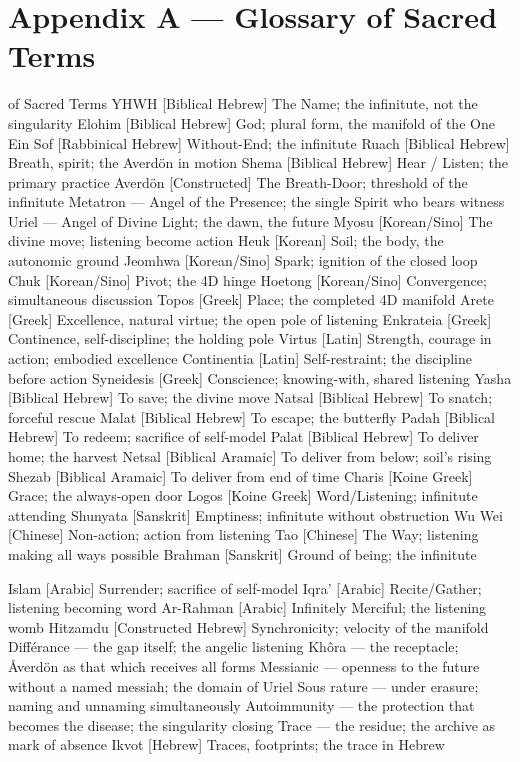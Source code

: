\documentclass[12pt,openany]{book}
\begin{document}
\chapter{Appendix A --- Glossary of Sacred Terms}

of Sacred Terms YHWH [Biblical Hebrew] The Name; the infinitute, not the singularity Elohim [Biblical Hebrew] God; plural form, the manifold of the One Ein Sof [Rabbinical Hebrew] Without-End; the infinitute Ruach [Biblical Hebrew] Breath, spirit; the Averdön in motion Shema [Biblical Hebrew] Hear / Listen; the primary practice Averdön [Constructed] The Breath-Door; threshold of the infinitute Metatron --- Angel of the Presence; the single Spirit who bears witness Uriel --- Angel of Divine Light; the dawn, the future Myosu [Korean/Sino] The divine move; listening become action Heuk [Korean] Soil; the body, the autonomic ground Jeomhwa [Korean/Sino] Spark; ignition of the closed loop Chuk [Korean/Sino] Pivot; the 4D hinge Hoetong [Korean/Sino] Convergence; simultaneous discussion Topos [Greek] Place; the completed 4D manifold Arete [Greek] Excellence, natural virtue; the open pole of listening Enkrateia [Greek] Continence, self-discipline; the holding pole Virtus [Latin] Strength, courage in action; embodied excellence Continentia [Latin] Self-restraint; the discipline before action Syneidesis [Greek] Conscience; knowing-with, shared listening Yasha [Biblical Hebrew] To save; the divine move Natsal [Biblical Hebrew] To snatch; forceful rescue Malat [Biblical Hebrew] To escape; the butterfly Padah [Biblical Hebrew] To redeem; sacrifice of self-model Palat [Biblical Hebrew] To deliver home; the harvest Netsal [Biblical Aramaic] To deliver from below; soil's rising Shezab [Biblical Aramaic] To deliver from end of time Charis [Koine Greek] Grace; the always-open door Logos [Koine Greek] Word/Listening; infinitute attending Shunyata [Sanskrit] Emptiness; infinitute without obstruction Wu Wei [Chinese] Non-action; action from listening Tao [Chinese] The Way; listening making all ways possible Brahman [Sanskrit] Ground of being; the infinitute


Islam [Arabic] Surrender; sacrifice of self-model Iqra' [Arabic] Recite/Gather; listening becoming word Ar-Rahman [Arabic] Infinitely Merciful; the listening womb Hitzamdu [Constructed Hebrew] Synchronicity; velocity of the manifold Différance --- the gap itself; the angelic listening Khôra --- the receptacle; Åverdön as that which receives all forms Messianic --- openness to the future without a named messiah; the domain of Uriel Sous rature --- under erasure; naming and unnaming simultaneously Autoimmunity --- the protection that becomes the disease; the singularity closing Trace --- the residue; the archive as mark of absence Ikvot [Hebrew] Traces, footprints; the trace in Hebrew
\end{document}
